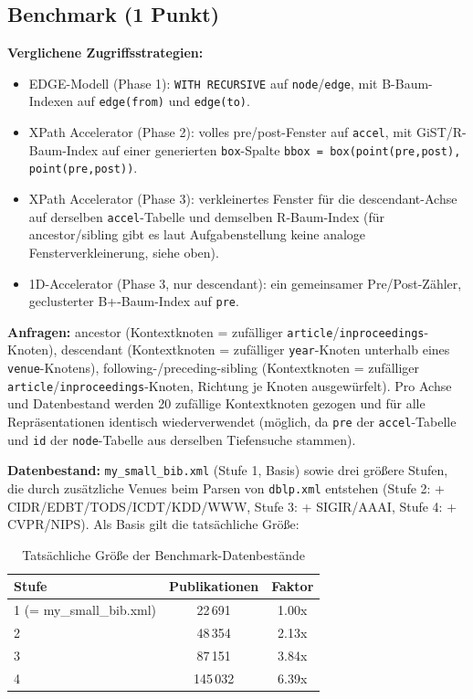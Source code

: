 \documentclass[11pt]{scrartcl}
\begin{document}
\subsection*{Benchmark (1 Punkt)}

\textbf{Verglichene Zugriffsstrategien:}
\begin{itemize}
  \item[A] EDGE-Modell (Phase 1): \texttt{WITH RECURSIVE} auf \texttt{node}/\texttt{edge}, mit B-Baum-Indexen auf \texttt{edge(from)} und \texttt{edge(to)}.
  \item[B] XPath Accelerator (Phase 2): volles pre/post-Fenster auf \texttt{accel}, mit GiST/R-Baum-Index auf einer generierten \texttt{box}-Spalte \texttt{bbox = box(point(pre,post), point(pre,post))}.
  \item[C] XPath Accelerator (Phase 3): verkleinertes Fenster für die descendant-Achse auf derselben \texttt{accel}-Tabelle und demselben R-Baum-Index (für ancestor/sibling gibt es laut Aufgabenstellung keine analoge Fensterverkleinerung, siehe oben).
  \item[D] 1D-Accelerator (Phase 3, nur descendant): ein gemeinsamer Pre/Post-Zähler, geclusterter B+-Baum-Index auf \texttt{pre}.
\end{itemize}

\textbf{Anfragen:} ancestor (Kontextknoten = zufälliger \texttt{article}/\texttt{inproceedings}-Knoten), descendant (Kontextknoten = zufälliger \texttt{year}-Knoten unterhalb eines \texttt{venue}-Knotens), following-/preceding-sibling (Kontextknoten = zufälliger \texttt{article}/\texttt{inproceedings}-Knoten, Richtung je Knoten ausgewürfelt). Pro Achse und Datenbestand werden 20 zufällige Kontextknoten gezogen und für alle Repräsentationen identisch wiederverwendet (möglich, da \texttt{pre} der \texttt{accel}-Tabelle und \texttt{id} der \texttt{node}-Tabelle aus derselben Tiefensuche stammen).

\textbf{Datenbestand:} \texttt{my\_small\_bib.xml} (Stufe 1, Basis) sowie drei größere Stufen, die durch zusätzliche Venues beim Parsen von \texttt{dblp.xml} entstehen (Stufe 2: + CIDR/EDBT/TODS/ICDT/KDD/WWW, Stufe 3: + SIGIR/AAAI, Stufe 4: + CVPR/NIPS). Als Basis gilt die tatsächliche Größe:

\begin{table}[h]
	\centering
	\begin{tabular}{l c c}
		\toprule
		Stufe & Publikationen & Faktor \\
		\midrule
		1 (= my\_small\_bib.xml) & 22\,691 & 1.00x \\
		2 & 48\,354  & 2.13x \\
		3 & 87\,151  & 3.84x \\
		4 & 145\,032 & 6.39x \\
		\bottomrule
	\end{tabular}
	\caption{Tatsächliche Größe der Benchmark-Datenbestände}
\end{table}
\end{document}

